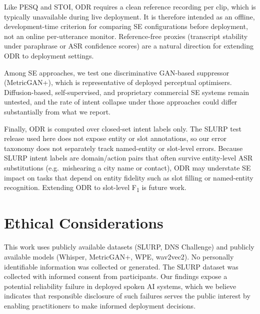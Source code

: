 \documentclass[11pt]{article}
\begin{document}
Like PESQ and STOI, ODR requires a clean reference recording per clip,
which is typically unavailable during live deployment. It is therefore
intended as an offline, development-time criterion for comparing SE
configurations before deployment, not an online per-utterance monitor.
Reference-free proxies (transcript stability under paraphrase or ASR
confidence scores) are a natural direction for extending ODR to
deployment settings.

Among SE approaches, we test one discriminative GAN-based suppressor
(MetricGAN{+}), which is representative of deployed perceptual
optimisers. Diffusion-based, self-supervised, and proprietary commercial
SE systems remain untested, and the rate of intent collapse under those
approaches could differ substantially from what we report.

Finally, ODR is computed over closed-set intent labels only. The
SLURP test release used here does not expose entity or slot annotations,
so our error taxonomy does not separately track named-entity or
slot-level errors. Because SLURP intent labels are domain/action pairs
that often survive entity-level ASR substitutions (e.g.\ mishearing a
city name or contact), ODR may understate SE impact on tasks that
depend on entity fidelity such as slot filling or named-entity
recognition. Extending ODR to slot-level F\textsubscript{1} is future
work.

\section*{Ethical Considerations}
This work uses publicly available datasets (SLURP,
DNS Challenge) and publicly available models
(Whisper, MetricGAN{+}, WPE, wav2vec2). No
personally identifiable information was collected
or generated. The SLURP dataset was collected with
informed consent from participants. Our findings
expose a potential reliability failure in deployed
spoken AI systems, which we believe indicates that responsible
disclosure of such failures serves the public
interest by enabling practitioners to make
informed deployment decisions.

%


 
\end{document}
